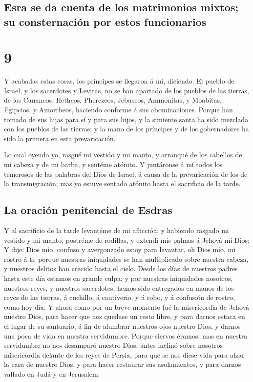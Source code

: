 \hypertarget{esra-se-da-cuenta-de-los-matrimonios-mixtos-su-consternaciuxf3n-por-estos-funcionarios}{%
\subsection{Esra se da cuenta de los matrimonios mixtos; su
consternación por estos
funcionarios}\label{esra-se-da-cuenta-de-los-matrimonios-mixtos-su-consternaciuxf3n-por-estos-funcionarios}}

\hypertarget{section-8}{%
\section{9}\label{section-8}}

 Y acabadas estas cosas, los príncipes se llegaron á mí,
diciendo: El pueblo de Israel, y los sacerdotes y Levitas, no se han
apartado de los pueblos de las tierras, de los Cananeos, Hetheos,
Pherezeos, Jebuseos, Ammonitas, y Moabitas, Egipcios, y Amorrheos,
haciendo conforme á sus abominaciones.  Porque han tomado de
sus hijas para sí y para sus hijos, y la simiente santa ha sido mezclada
con los pueblos de las tierras; y la mano de los príncipes y de los
gobernadores ha sido la primera en esta prevaricación.

 Lo cual oyendo yo, rasgué mi vestido y mi manto, y arranqué
de los cabellos de mi cabeza y de mi barba, y sentéme atónito.
 Y juntáronse á mí todos los temerosos de las palabras del
Dios de Israel, á causa de la prevaricación de los de la transmigración;
mas yo estuve sentado atónito hasta el sacrificio de la tarde.

\hypertarget{la-oraciuxf3n-penitencial-de-esdras}{%
\subsection{La oración penitencial de
Esdras}\label{la-oraciuxf3n-penitencial-de-esdras}}

 Y al sacrificio de la tarde levantéme de mi aflicción; y
habiendo rasgado mi vestido y mi manto, postréme de rodillas, y extendí
mis palmas á Jehová mi Dios;  Y dije: Dios mío, confuso y
avergonzado estoy para levantar, oh Dios mío, mi rostro á ti: porque
nuestras iniquidades se han multiplicado sobre nuestra cabeza, y
nuestros delitos han crecido hasta el cielo.  Desde los días
de nuestros padres hasta este día estamos en grande culpa; y por
nuestras iniquidades nosotros, nuestros reyes, y nuestros sacerdotes,
hemos sido entregados en manos de los reyes de las tierras, á cuchillo,
á cautiverio, y á robo, y á confusión de rostro, como hoy día.
 Y ahora como por un breve momento fué la misericordia de
Jehová nuestro Dios, para hacer que nos quedase un resto libre, y para
darnos estaca en el lugar de su santuario, á fin de alumbrar nuestros
ojos nuestro Dios, y darnos una poca de vida en nuestra servidumbre.
 Porque siervos éramos: mas en nuestra servidumbre no nos
desamparó nuestro Dios, antes inclinó sobre nosotros misericordia
delante de los reyes de Persia, para que se nos diese vida para alzar la
casa de nuestro Dios, y para hacer restaurar sus asolamientos, y para
darnos vallado en Judá y en Jerusalem.

